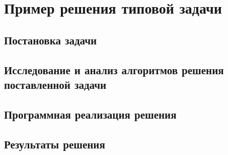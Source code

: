 \chapter{Пример решения типовой задачи}



\section{Постановка задачи}



\section{Исследование и анализ алгоритмов решения поставленной задачи}



\section{Программная реализация решения}



\section{Результаты решения}
